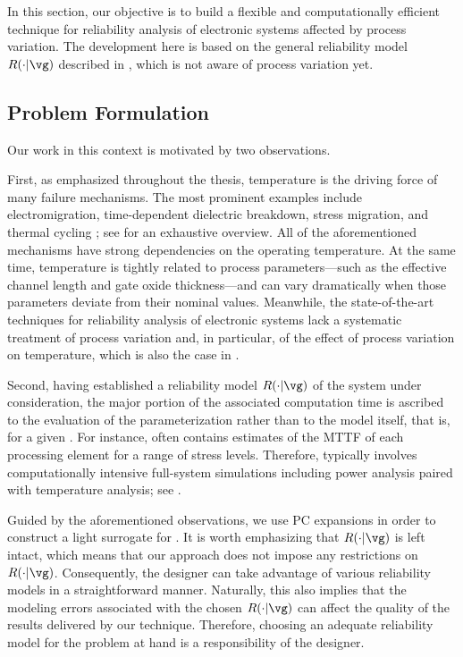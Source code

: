 In this section, our objective is to build a flexible and computationally
efficient technique for reliability analysis of electronic systems affected by
process variation. The development here is based on the general reliability
model $R(\cdot | \vg)$ described in , which is not
aware of process variation yet.

\subsection{Problem Formulation}

Our work in this context is motivated by two observations.

First, as emphasized throughout the thesis, temperature is the driving force of
many failure mechanisms. The most prominent examples include electromigration,
time-dependent dielectric breakdown, stress migration, and thermal cycling
\cite{xiang2010}; see \cite{jedec2016} for an exhaustive overview. All of the
aforementioned mechanisms have strong dependencies on the operating temperature.
At the same time, temperature is tightly related to process parameters---such as
the effective channel length and gate oxide thickness---and can vary
dramatically when those parameters deviate from their nominal values. Meanwhile,
the state-of-the-art techniques for reliability analysis of electronic systems
lack a systematic treatment of process variation and, in particular, of the
effect of process variation on temperature, which is also the case in
.

Second, having established a reliability model $R(\cdot | \vg)$ of the system
under consideration, the major portion of the associated computation time is
ascribed to the evaluation of the parameterization \vg rather than to the model
itself, that is, for a given \vg. For instance, \vg often contains estimates of
the \ac{MTTF} of each processing element for a range of stress levels.
Therefore, \vg typically involves computationally intensive full-system
simulations including power analysis paired with temperature analysis; see
.

Guided by the aforementioned observations, we use \ac{PC} expansions in order to
construct a light surrogate for \vg. It is worth emphasizing that $R(\cdot |
\vg)$ is left intact, which means that our approach does not impose any
restrictions on $R(\cdot | \vg)$. Consequently, the designer can take advantage
of various reliability models in a straightforward manner. Naturally, this also
implies that the modeling errors associated with the chosen $R(\cdot | \vg)$ can
affect the quality of the results delivered by our technique. Therefore,
choosing an adequate reliability model for the problem at hand is a
responsibility of the designer.

